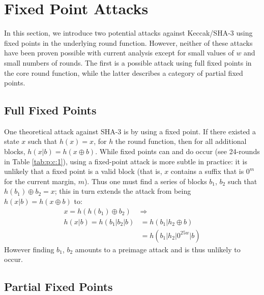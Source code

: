 \documentclass[10pt,twocolumn,twoside]{pnas-new}
\begin{document}

\section{Fixed Point Attacks} \label{sec:fixed}

In this section, we introduce two potential attacks against Keccak/SHA-3 using
fixed points in the underlying round function. However, neither of these
attacks have been proven possible with current analysis except for small values
of $w$ and small numbers of rounds. The first is a possible attack using full
fixed points in the core round function, while the latter describes a category
of partial fixed points.


\subsection{Full Fixed Points} \label{sec:f:full}


One theoretical attack against SHA-3 is by using a fixed point. If there
existed a state $x$ such that $h(x) = x$, for $h$ the round function, then
for all additional blocks, $h(x | b) = h(x \oplus b)$. While fixed points can
and do occur (see 24-rounds in Table \ref{tab:p:c:1}), using a fixed-point
attack is more subtle in practice: it is unlikely that a fixed point is a valid
block (that is, $x$ contains a suffix that is $0^{m}$ for the current margin,
$m$). Thus one must find a series of blocks $b_1$, $b_2$ such that
$h(b_1) \oplus b_2 = x$; this in turn extends the attack from being
$h(x | b) = h(x \oplus b)$ to:
\begin{align*}
    x = h(h(b_1) \oplus b_2) & \Rightarrow \\
    h(x | b) = h(b_1 | b_2 | b) & = h(b_1 | h_2 \oplus b) \\
    & = h(b_1 | h_2 | 0^{25w} | b)
\end{align*}
However finding $b_1$, $b_2$ amounts to a preimage attack and is thus unlikely
to occur.

\subsection{Partial Fixed Points} \label{sec:f:partial}
\end{document}

